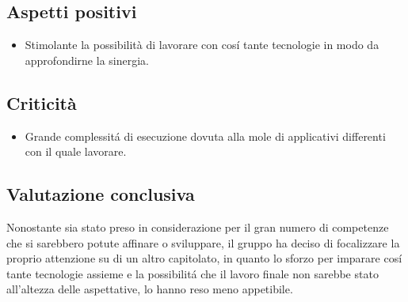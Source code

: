 \subsection{Aspetti positivi}
\begin{itemize}
	\item Stimolante la possibilità di lavorare con cosí tante tecnologie in modo da approfondirne la sinergia.
\end{itemize}

\subsection{Criticità}
\begin{itemize}
	\item Grande complessitá di esecuzione dovuta alla mole di applicativi differenti con il quale lavorare.
\end{itemize}

\subsection{Valutazione conclusiva}
Nonostante sia stato preso in considerazione per il gran numero di competenze che si sarebbero potute affinare o sviluppare, il gruppo ha deciso di focalizzare la proprio attenzione su di un altro capitolato\glos, in quanto lo sforzo per imparare cosí tante tecnologie assieme e la possibilitá che il lavoro finale non sarebbe stato all'altezza delle aspettative, lo hanno reso meno appetibile.